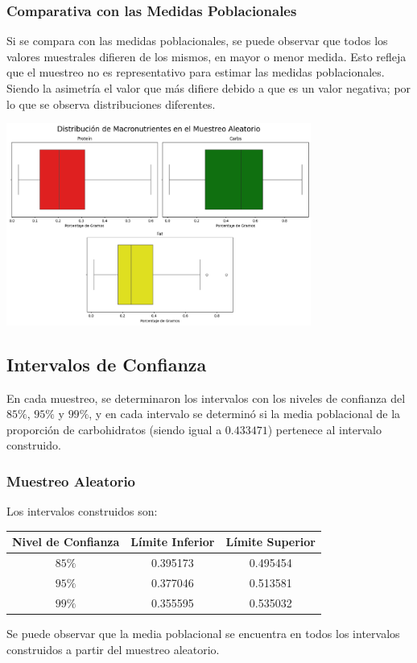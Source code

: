 \documentclass[12pt,a4paper]{article}
\begin{document}
    \subsubsection{Comparativa con las Medidas Poblacionales}
        Si se compara con las medidas poblacionales, se puede observar que todos 
        los valores muestrales difieren de los mismos, en mayor o menor medida. 
        Esto refleja que el muestreo no es representativo para estimar las medidas 
        poblacionales. Siendo la asimetría el valor que más difiere debido a que es 
        un valor negativa; por lo que se observa distribuciones diferentes.
        \begin{center}
            \includegraphics[width=0.75\textwidth]{Resources/3_02_plot_01.png}
        \end{center}

    \subsection{Intervalos de Confianza}
        En cada muestreo, se determinaron los intervalos 
        con los niveles de confianza del $85\%$, $95\%$ y $99\%$, 
        y en cada intervalo se determinó si la media poblacional de 
        la proporción de carbohidratos (siendo igual a $0.433471$) 
        pertenece al intervalo construido.

    \subsubsection{Muestreo Aleatorio}
        Los intervalos construidos son:
        \begin{center}
            \begin{tabular}{|c|c|c|}
                \hline
                Nivel de Confianza & Límite Inferior & Límite Superior \\
                \hline
                $85\%$ & 0.395173 & 0.495454 \\
                $95\%$ & 0.377046 & 0.513581 \\
                $99\%$ & 0.355595 & 0.535032 \\
                \hline
            \end{tabular}
        \end{center}
        Se puede observar que la media poblacional se 
        encuentra en todos los intervalos construidos 
        a partir del muestreo aleatorio.
            
\end{document}
